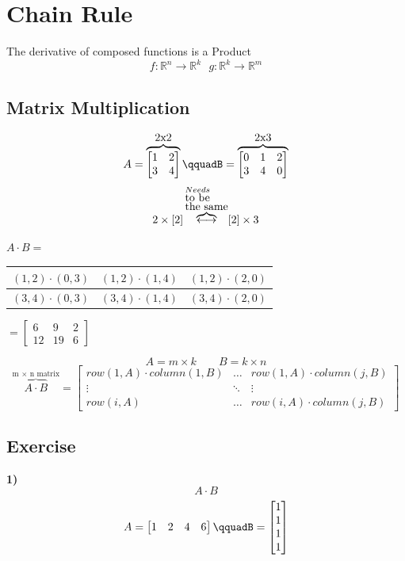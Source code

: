 \documentclass{article}
\begin{document}
\section{Chain Rule}
The derivative of composed functions is a Product
\[f:\mathbb{R}^n\rightarrow\mathbb{R}^k\mbox{     }g:\mathbb{R}^k\rightarrow\mathbb{R}^m\]

\subsection{Matrix Multiplication}
\[A= \overbrace{\begin{bmatrix}
    1&2\\
    3&4
\end{bmatrix}}^{\mbox{2x2}}\qquadB=\overbrace{\begin{bmatrix}
    0&1&2\\
    3&4&0
\end{bmatrix}}^{\mbox{2x3}}\]
\[2\times [2] \overbrace{\longleftrightarrow}^{\begin{subarray}
    \mbox{Needs}\\
    \mbox{to be}\\
    \mbox{the same}
\end{subarray}} [2]\times 3\]

\begin{center}
    $A\cdot B = $
    \begin{tabular}{lll}
        \hline
        $(1,2)\cdot (0,3)$ & $(1,2)\cdot (1,4)$ & $(1,2)\cdot (2,0)$ \\ \hline
        $(3,4)\cdot (0,3)$ & $(3,4)\cdot (1,4)$ & $(3,4)\cdot (2,0)$ \\ \hline
    \end{tabular}
    $=\begin{bmatrix}
        6&9&2\\
        12&19&6
    \end{bmatrix}$
\end{center}

\[A = m\times k\qquad B=k\times n\]
\mbox{}
\[\overbrace{A\cdot B}^{\mbox{m $\times$ n matrix}}=\begin{bmatrix}
    row(1,A)\cdot column(1,B)& \ldots&row(1,A)\cdot column(j,B)\\
    \vdots&\ddots&\vdots\\
    row(i,A)&\ldots&row(i,A)\cdot column(j,B)
\end{bmatrix}\]
\subsection*{Exercise}
\textbf{1)} 
\[A\cdot B\]
\[A=\begin{bmatrix}
    1&2&4&6
\end{bmatrix}\qquadB=\begin{bmatrix}
    1\\
    1\\
    1\\
    1
\end{bmatrix}\]
\end{document}

